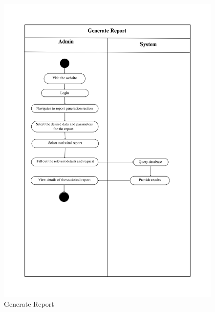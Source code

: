\begin{figure}[h!]
    \centering
    \includegraphics[width=1\textwidth]{Images/Activity Diagrams/33 Generate Report.png}
    \caption{Generate Report}
    \label{fig:activity-generate-report}
\end{figure}

